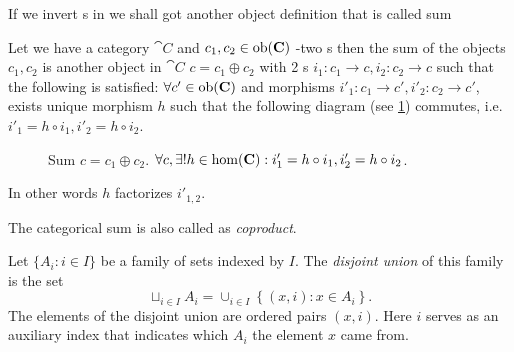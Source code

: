 If we invert s in  we shall
got another 
object definition that is called sum

\begin{definition}[Sum]
\label{def:sum}
Let we have a category $\cat{C}$ and $c_1, c_2 \in \mathrm{ob}(\mathbf{C})$ -two
s then the sum of the objects $c_1, c_2$ is
another object in $\cat{C}$ $c = c_1 \oplus c_2$ with 2
s $i_1: c_1 \to c, i_2: c_2 \to c$ such that
the following  is satisfied: $\forall c'
\in \mathrm{ob}(\mathbf{C})$
and morphisms $i'_1: c_1 \to c', i'_2: c_2 \to c'$, exists unique
morphism $h$ such that the following diagram (see \cref{fig:sum})
commutes, i.e. $i'_1 = h \circ i_1, i'_2 = h \circ i_2$.
\begin{figure}[H]
  \centering
  \caption{Sum $c = c_1 \oplus c_2$. $\forall c, \exists! h \in
    \mathrm{hom}(\mathbf{C}): i'_1 = h \circ i_1, i'_2 = h \circ i_2 $.}
  \label{fig:sum}
\end{figure}
In other words $h$ factorizes $i'_{1,2}$.

The categorical sum is also called as \textit{coproduct}.
\end{definition}

\begin{definition}
  \label{def:disjoint_union}
  Let $\{A_i: i \in I\}$ be a family of sets 
  indexed by $I$. The 
  \textit{disjoint union} \cite{wiki:disjointunion} of this family is
  the set 
  \[
  \sqcup_{i \in I} A_i = \cup_{i \in I}\left\{
  \left(x, i\right): x \in A_i
  \right\}.
  \]
  The elements of the disjoint union are ordered pairs $(x, i)$. Here $i$
  serves as an auxiliary index that indicates which $A_i$ the element $x$
  came from.
\end{definition}

